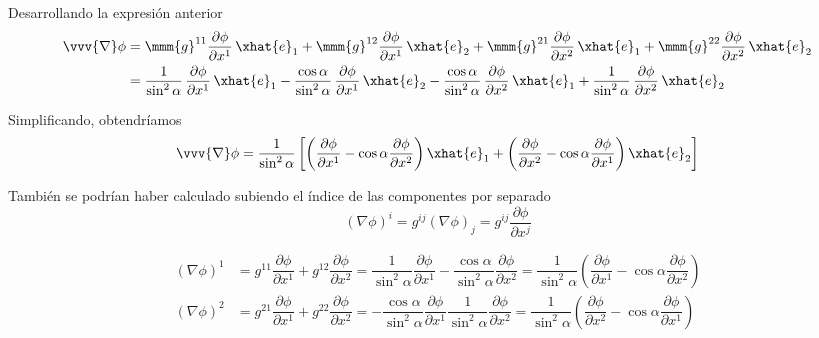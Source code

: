 Desarrollando la expresión anterior
\begin{align*}
  \vvv{\nabla}\phi
  &=
    \mmm{g}^{11}\dfrac{\partial\phi}{\partial x^1}\,\xhat{e}_1
    + \mmm{g}^{12}\dfrac{\partial\phi}{\partial x^1}\,\xhat{e}_2
    + \mmm{g}^{21}\dfrac{\partial\phi}{\partial x^2}\,\xhat{e}_1
    + \mmm{g}^{22}\dfrac{\partial\phi}{\partial x^2}\,\xhat{e}_2\\
  &=
    \dfrac{1}{\sin^2\alpha}\,\dfrac{\partial\phi}{\partial x^1}\,\xhat{e}_1
    - \dfrac{\cos\alpha}{\sin^2\alpha}\,\dfrac{\partial\phi}{\partial x^1}\,\xhat{e}_2
    - \dfrac{\cos\alpha}{\sin^2\alpha}\,\dfrac{\partial\phi}{\partial x^2}\,\xhat{e}_1
    + \dfrac{1}{\sin^2\alpha}\,\dfrac{\partial\phi}{\partial x^2}\,\xhat{e}_2
\end{align*}

Simplificando, obtendríamos
\begin{equation}\label{eq:R2-oblic_gradiente_contrav}
  \vvv{\nabla}\phi
  = \dfrac{1}{\sin^2\alpha}
  \left[%
    \left(%
      \dfrac{\partial\phi}{\partial x^1}-\cos\alpha\dfrac{\partial\phi}{\partial x^2}
    \right) \xhat{e}_1
    +\left(%
      \dfrac{\partial\phi}{\partial x^2}-\cos\alpha\dfrac{\partial\phi}{\partial x^1}
    \right) \xhat{e}_2
  \right]
\end{equation}

{\small
  También se podrían haber calculado subiendo el índice de las componentes por separado
\begin{equation}
  (\nabla\phi)^i
  = g^{ij} (\nabla\phi)_j = g^{ij}\dfrac{\partial\phi}{\partial x^j}
\end{equation}
}

{\small
\begin{align*}
  (\nabla\phi)^1
  &=
    g^{11} \dfrac{\partial\phi}{\partial x^1}
    + g^{12} \dfrac{\partial\phi}{\partial x^2}
    =
    \dfrac{1}{\sin^2\alpha}\dfrac{\partial\phi}{\partial x^1}
    - \dfrac{\cos\alpha}{\sin^2\alpha}\dfrac{\partial\phi}{\partial x^2}
    =
    \dfrac{1}{\sin^2\alpha}
    \left(%
    \dfrac{\partial\phi}{\partial x^1}-\cos\alpha\dfrac{\partial\phi}{\partial x^2}
    \right)\\
  (\nabla\phi)^2
  &=
    g^{21} \dfrac{\partial\phi}{\partial x^1}
    + g^{22} \dfrac{\partial\phi}{\partial x^2}
    =
    - \dfrac{\cos\alpha}{\sin^2\alpha}\dfrac{\partial\phi}{\partial x^1}    
    \dfrac{1}{\sin^2\alpha}\dfrac{\partial\phi}{\partial x^2}
    =
    \dfrac{1}{\sin^2\alpha}
    \left(%
    \dfrac{\partial\phi}{\partial x^2}-\cos\alpha\dfrac{\partial\phi}{\partial x^1}
    \right)  
\end{align*}
}

